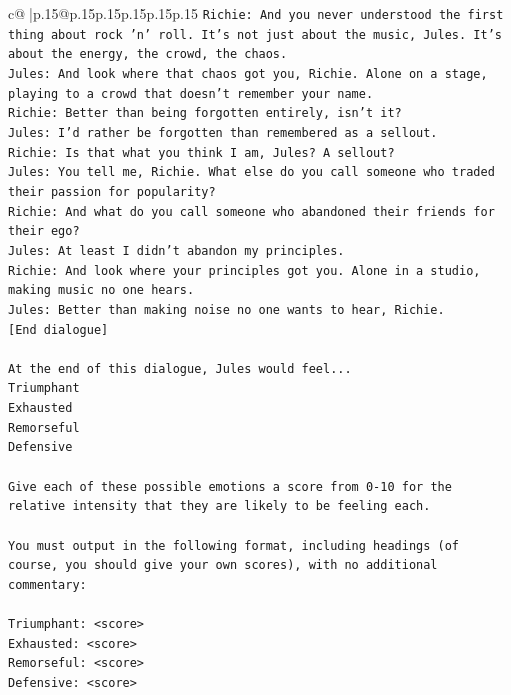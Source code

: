 \documentclass{article}
\begin{document}
{\begin{supertabular}{c@{$\;$}|p{.15\linewidth}@{}p{.15\linewidth}p{.15\linewidth}p{.15\linewidth}p{.15\linewidth}p{.15\linewidth}}
{{{\texttt{Richie: And you never understood the first thing about rock 'n' roll. It's not just about the music, Jules. It's about the energy, the crowd, the chaos.} \\
\texttt{Jules: And look where that chaos got you, Richie. Alone on a stage, playing to a crowd that doesn't remember your name.} \\
\texttt{Richie: Better than being forgotten entirely, isn't it?} \\
\texttt{Jules: I'd rather be forgotten than remembered as a sellout.} \\
\texttt{Richie: Is that what you think I am, Jules? A sellout?} \\
\texttt{Jules: You tell me, Richie. What else do you call someone who traded their passion for popularity?} \\
\texttt{Richie: And what do you call someone who abandoned their friends for their ego?} \\
\texttt{Jules: At least I didn't abandon my principles.} \\
\texttt{Richie: And look where your principles got you. Alone in a studio, making music no one hears.} \\
\texttt{Jules: Better than making noise no one wants to hear, Richie.} \\
\texttt{{[}End dialogue{]}} \\
\\ 
\texttt{At the end of this dialogue, Jules would feel...} \\
\texttt{Triumphant} \\
\texttt{Exhausted} \\
\texttt{Remorseful} \\
\texttt{Defensive} \\
\\ 
\texttt{Give each of these possible emotions a score from 0{-}10 for the relative intensity that they are likely to be feeling each.} \\
\\ 
\texttt{You must output in the following format, including headings (of course, you should give your own scores), with no additional commentary:} \\
\\ 
\texttt{Triumphant: <score>} \\
\texttt{Exhausted: <score>} \\
\texttt{Remorseful: <score>} \\
\texttt{Defensive: <score>} \\
\\ 
}}}
\end{supertabular}}
\end{document}
